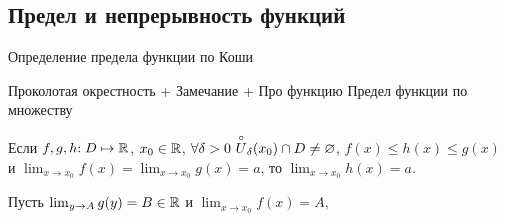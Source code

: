 
\subsection{Предел и непрерывность функций}

Определение предела функции по Коши

Проколотая окрестность
+ Замечание
+ Про функцию
Предел функции по множеству




\begin{theorem}
	Если $f, g, h{:}\; D \mapsto \mathbb{R}$, $x_0 \in \mathbb{R}$, $\forall \delta > 0\ \overset{\circ}{U}_\delta(x_0) \cap D \ne \varnothing$, $f(x) \le h(x) \le g(x)$ и $\lim_{x \to x_0} f(x) = \lim_{x \to x_0} g(x) = a$, то $\lim_{x \to x_0} h(x) = a$.
\end{theorem}

Пусть $\lim_{y \to A} g(y) = B \in \mathbb{R}$ и $\lim_{x \to x_0} f(x) = A$, 



